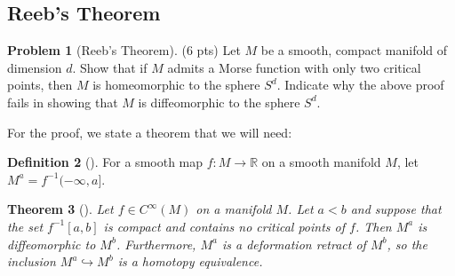 \documentclass[reqno]{amsart}
\newtheorem{theorem}{Theorem}[section]
\theoremstyle{definition}
\newtheorem{definition}[theorem]{Definition}
\newtheorem{problem}[theorem]{Problem}
\theoremstyle{remark}
\begin{document}
\subsection{Reeb's Theorem}

\begin{problem}[Reeb's Theorem]\label{Reeb's-Theorem}
        (6 pts) Let $M$ be a smooth, compact manifold of
        dimension $d$. Show that if $M$ admits a Morse
        function with only two critical points, then
        $M$ is homeomorphic to the sphere $S^{d}$. Indicate
        why the above proof fails in showing that $M$ is
        diffeomorphic to the sphere $S^{d}$.
    \end{problem}

    For the proof, we state a theorem that we will need:
    \begin{definition}[]
        For a smooth map $f \colon M \to \mathbb{R}$ on a 
        smooth manifold $M$, let
        $M^{a} = f^{-1} (-\infty, a]$.
    \end{definition}

    \begin{theorem}[]\label{Thm1}
        Let $f \in C^{\infty}(M)$ on a manifold $M$.
        Let $a < b$ and suppose that the set
        $f^{-1}\left[ a,b \right] $ is compact and
        contains no critical points of $f$. Then
        $M^{a}$ is diffeomorphic to $M^{b}$. Furthermore,
        $M^{a}$ is a deformation retract of
        $M^{b}$, so the inclusion $M^{a} \hookrightarrow 
        M^{b}$ is a homotopy equivalence.
    \end{theorem}
\end{document}
